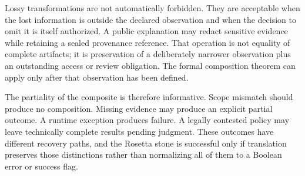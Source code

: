 Lossy transformations are not automatically forbidden. They are acceptable when the lost information is outside the declared observation and when the decision to omit it is itself authorized. A public explanation may redact sensitive evidence while retaining a sealed provenance reference. That operation is not equality of complete artifacts; it is preservation of a deliberately narrower observation plus an outstanding access or review obligation. The formal composition theorem can apply only after that observation has been defined.

The partiality of the composite is therefore informative. Scope mismatch should produce no composition. Missing evidence may produce an explicit partial outcome. A runtime exception produces failure. A legally contested policy may leave technically complete results pending judgment. These outcomes have different recovery paths, and the Rosetta stone is successful only if translation preserves those distinctions rather than normalizing all of them to a Boolean error or success flag.
